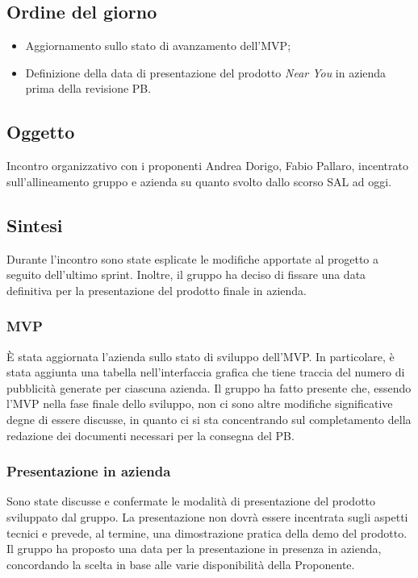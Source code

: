 \documentclass[10pt]{article}
\begin{document}
\subsection{Ordine del giorno}
\begin{itemize}
    \item Aggiornamento sullo stato di avanzamento dell’MVP;
    \item Definizione della data di presentazione del prodotto \textit{Near You} in azienda prima della revisione PB.
\end{itemize}

\subsection{Oggetto}
Incontro organizzativo con i proponenti Andrea Dorigo, Fabio Pallaro, incentrato sull'allineamento gruppo e azienda su quanto svolto dallo scorso SAL ad oggi.

\subsection{Sintesi}
Durante l'incontro sono state esplicate le modifiche apportate al progetto a seguito dell'ultimo sprint. Inoltre, il gruppo ha deciso di fissare una data definitiva per la presentazione del prodotto finale in azienda.

    
    \subsubsection{MVP}
    È stata aggiornata l'azienda sullo stato di sviluppo dell'MVP. In particolare, è stata aggiunta una tabella nell'interfaccia grafica che tiene traccia del numero di pubblicità generate per ciascuna azienda. Il gruppo ha fatto presente che, essendo l'MVP nella fase finale dello sviluppo, non ci sono altre modifiche significative degne di essere discusse, in quanto ci si sta concentrando sul completamento della redazione dei documenti necessari per la consegna del PB.

    \subsubsection{Presentazione in azienda}
    Sono state discusse e confermate le modalità di presentazione del prodotto sviluppato dal gruppo. La presentazione non dovrà essere incentrata sugli aspetti tecnici e prevede, al termine, una dimostrazione pratica della demo del prodotto. Il gruppo ha proposto una data per la presentazione in presenza in azienda, concordando la scelta in base alle varie disponibilità della Proponente.
\end{document}
